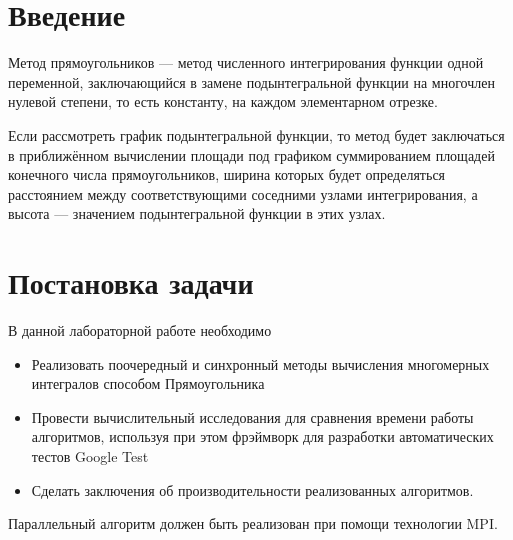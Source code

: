 \documentclass{report}
\begin{document}
\setcounter{page}{2}

\tableofcontents
\newpage

\section*{Введение}
\par 
Метод прямоугольников — метод численного интегрирования функции одной переменной, заключающийся в замене подынтегральной функции на многочлен нулевой степени, то есть константу, на каждом элементарном отрезке.
\par
Если рассмотреть график подынтегральной функции, то метод будет заключаться в приближённом вычислении площади под графиком суммированием площадей конечного числа прямоугольников, ширина которых будет определяться расстоянием между соответствующими соседними узлами интегрирования, а высота — значением подынтегральной функции в этих узлах.
\newpage

\section*{Постановка задачи}
\par В данной лабораторной работе необходимо
\begin{itemize}
\item  Реализовать поочередный и синхронный методы вычисления многомерных интегралов способом Прямоугольника
\item Провести вычислительный исследования для сравнения времени работы алгоритмов, 
используя при этом фрэймворк для разработки автоматических тестов Google Test
\item  Сделать заключения об производительности реализованных алгоритмов.
\end{itemize}
\par Параллельный алгоритм должен быть реализован при помощи технологии MPI.
\newpage

\end{document}
